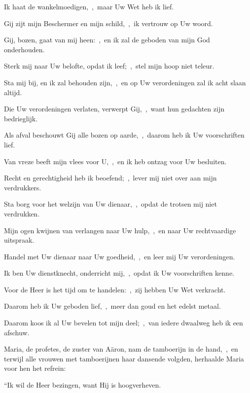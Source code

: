\documentclass[12pt,twoside,a5paper]{article}
\begin{document}
\begin{halfparskip}
   

  Ik haat de wankelmoedigen,~\sep\ maar Uw Wet heb ik lief.


  Gij zijt mijn Beschermer en mijn schild,~\sep\ ik vertrouw op Uw woord.

  Gij, bozen, gaat van mij heen:~\sep\ en ik zal de geboden van mijn God onderhouden.

  Sterk mij naar Uw belofte, opdat ik leef;~\sep\ stel mijn hoop niet teleur.

  Sta mij bij, en ik zal behouden zijn,~\sep\ en op Uw verordeningen zal ik acht slaan altijd.

  Die Uw verordeningen verlaten, verwerpt Gij,~\sep\ want hun gedachten zijn bedrieglijk.

  Als afval beschouwt Gij alle bozen op aarde,~\sep\ daarom heb ik Uw voorschriften lief.

  Van vreze beeft mijn vlees voor U,~\sep\ en ik heb ontzag voor Uw besluiten.

  Recht en gerechtigheid heb ik beoefend;~\sep\ lever mij niet over aan mijn verdrukkers.

  Sta borg voor het welzijn van Uw dienaar,~\sep\ opdat de trotsen mij niet verdrukken.

  Mijn ogen kwijnen van verlangen naar Uw hulp,~\sep\ en naar Uw rechtvaardige uitspraak.

  Handel met Uw dienaar naar Uw goedheid,~\sep\ en leer mij Uw verordeningen.

  Ik ben Uw dienstknecht, onderricht mij,~\sep\ opdat ik Uw voorschriften kenne.

  Voor de Heer is het tijd om te handelen:~\sep\ zij hebben Uw Wet verkracht.

  Daarom heb ik Uw geboden lief,~\sep\ meer dan goud en het edelst metaal.

  Daarom koos ik al Uw bevelen tot mijn deel;~\sep\ van iedere dwaalweg heb ik een afschuw.
\end{halfparskip}

\begin{halfparskip}
   

  Maria, de profetes, de zuster van Aäron, nam de tamboerijn in de hand,~\sep\ en terwijl alle vrouwen met
  tamboerijnen haar dansende volgden, herhaalde Maria voor hen het refrein:


  ``Ik wil de Heer bezingen, want Hij is hoogverheven.
\end{halfparskip}
\end{document}
